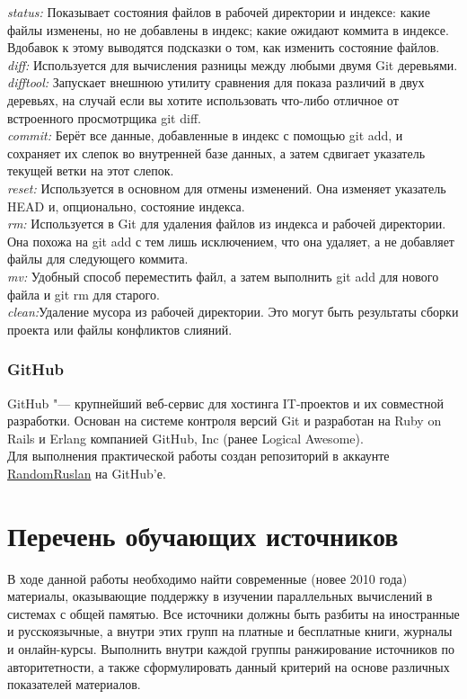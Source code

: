 \documentclass{article}
\begin{document}
		\textit{status:} Показывает состояния файлов в рабочей директории и индексе: какие файлы изменены, но не добавлены в индекс; какие ожидают коммита в индексе. Вдобавок к этому выводятся подсказки о том, как изменить состояние файлов.\\
		
		\textit{diff:} Используется для вычисления разницы между любыми двумя Git деревьями.\\ 
		
		\textit{difftool:} Запускает внешнюю утилиту сравнения для показа различий в двух деревьях, на случай если вы хотите использовать что-либо отличное от встроенного просмотрщика git diff.\\
		
		\textit{commit:} Берёт все данные, добавленные в индекс с помощью git add, и сохраняет их слепок во внутренней базе данных, а затем сдвигает указатель текущей ветки на этот слепок.\\
		
		\textit{reset:} Используется в основном для отмены изменений. Она изменяет указатель HEAD и, опционально, состояние индекса.\\
		
		\textit{rm:} Используется в Git для удаления файлов из индекса и рабочей директории. Она похожа на git add с тем лишь исключением, что она удаляет, а не добавляет файлы для следующего коммита.\\
		
		\textit{mv:} Удобный способ переместить файл, а затем выполнить git add для нового файла и git rm для старого.\\
		
		\textit{clean:}Удаление мусора из рабочей директории. Это могут быть результаты сборки проекта или файлы конфликтов слияний.
		
		\subsubsection{GitHub}
		GitHub "--- крупнейший веб-сервис для хостинга IT-проектов и их совместной разработки. Основан на системе контроля версий Git и разработан на Ruby on Rails и Erlang компанией GitHub, Inc (ранее Logical Awesome).\\
		
		Для выполнения практической работы создан репозиторий в аккаунте \href{http://github.com/RandomRuslan/SMP_Practice}{RandomRuslan} на GitHub'е.\\
\newpage
\section{Перечень обучающих источников}
	В ходе данной работы необходимо найти современные (новее 2010 года) материалы, оказывающие поддержку в изучении параллельных вычислений в системах с общей памятью. Все источники должны быть разбиты на иностранные и русскоязычные, а внутри этих групп на платные и бесплатные книги, журналы и онлайн-курсы. Выполнить внутри каждой группы ранжирование источников по авторитетности, а также сформулировать данный критерий на основе различных показателей материалов.
\newpage
\end{document}
